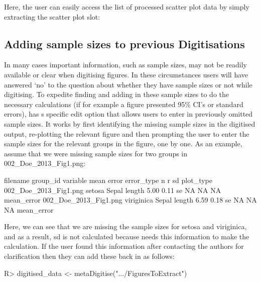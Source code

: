 \documentclass[article]{jss}
\newcommand{\fct}[1]{\code{#1()}}
\begin{document}
Here, the user can easily access the list of processed scatter plot data by simply extracting the scatter plot slot:

\begin{CodeChunk}
\end{CodeChunk}

\subsection{Adding sample sizes to previous Digitisations}
In many cases important information, such as sample sizes, may not be readily available or clear when digitising figures. In these circumstances users will have answered `no' to the question about whether they have sample sizes or not while digitising. To expedite finding and adding in these sample sizes to do the necessary calculations (if for example a figure presented 95\% CI's or standard errors), \fct{metaDigitise} has s specific edit option that allows users to enter in previously omitted sample sizes. It works by first identifying the missing sample sizes in the digitised output, re-plotting the relevant figure and then prompting the user to enter the sample sizes for the relevant groups in the figure, one by one. As an example, assume that we were missing sample sizes for two groups in 002\_Doe\_2013\_Fig1.png:

\begin{CodeChunk}
{\scriptsize
\begin{CodeOutput}
            filename    group_id         variable   mean  error error_type n    r    sd   plot_type
002_Doe_2013_Fig1.png      setosa  Sepal length      5.00  0.11  se        NA  NA    NA  mean_error
002_Doe_2013_Fig1.png  viriginica  Sepal length      6.59  0.18  se        NA  NA    NA  mean_error
\end{CodeOutput}
}
\end{CodeChunk}

Here, we can see that we are missing the sample sizes for setosa and viriginica, and as a result, sd is not calculated because \fct{metaDigitise} needs this information to make the calculation. If the user found this information after contacting the authors for clarification then they can add these back in as follows:

\begin{CodeChunk}
\begin{CodeInput}
R> digitised_data <- metaDigitise(".../FiguresToExtract")
\end{CodeInput}
\end{CodeChunk}
\end{document}

